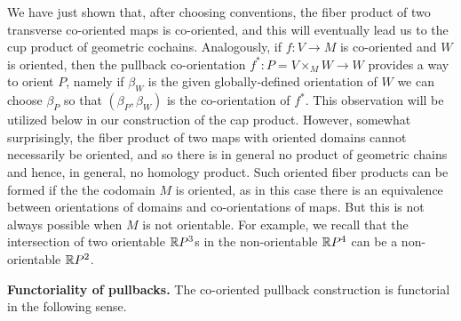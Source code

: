\begin{remark}\label{R: what products exist}
We have just shown that, after choosing conventions, the fiber product of two transverse co-oriented maps is co-oriented, and this will eventually lead us to the cup product of geometric cochains.
Analogously, if $f:V\to M$ is co-oriented and $W$ is oriented, then the pullback co-orientation $f^*:P=V\times_MW\to W$ provides a way to orient $P$, namely if $\beta_W$ is the given globally-defined orientation of $W$ we can choose $\beta_P$ so that $(\beta_P,\beta_W)$ is the co-orientation of $f^*$. This observation will be utilized below in our construction of the cap product.
However, somewhat surprisingly, the fiber product of two maps with oriented domains cannot necessarily be oriented, and so there is in general no product of geometric chains and hence, in general, no homology product. Such oriented fiber products can be formed if the the codomain $M$ is oriented, as in this case there is an equivalence between orientations of domains and co-orientations of maps. But this is not always possible when $M$ is not orientable. For example, we recall that the intersection of two orientable $\mathbb{R} P^3$s in the non-orientable $\mathbb{R} P^4$ can be a non-orientable $\mathbb{R} P^2$.
\end{remark}


\textbf{Functoriality of pullbacks.} The co-oriented pullback construction is functorial in the following sense.



